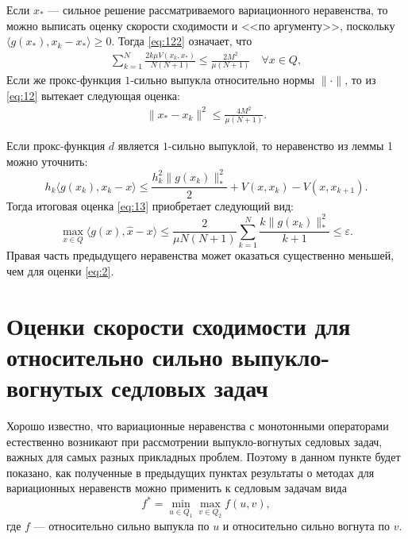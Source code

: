     \begin{remark}
        Если $x_*$ --- сильное решение рассматриваемого вариационного не\-равенства, то можно выписать оценку скорости сходимости и <<по аргументу>>, поскольку $\langle g(x_*), x_k - x_*\rangle \geq 0$. Тогда \eqref{eq:122} означает, что 
            \begin{equation} \label{eq:12}
            \begin{aligned} 
                \sum_{k=1}^{N} \frac{2k\mu V(x_k, x_*)}{N(N+1)} \leq \frac{2M^2}{\mu(N+1)} \quad  \forall x \in Q,
            \end{aligned}
            \end{equation}
        Если же прокс-функция $1$-сильно выпукла относительно нормы $\|\cdot\|$, то из \eqref{eq:12} вытекает следующая оценка:
            \begin{equation} 
            \begin{aligned} 
                \|x_* - x_k\|^2 \leq \frac{4M^2}{\mu(N+1)}.
            \end{aligned}
            \end{equation}
    \end{remark}
    \begin{remark} \label{remark4}
        Если прокс-функция $d$ является $1$-сильно выпуклой, то неравенство из леммы 1 можно уточнить:
        \begin{equation} \label{base_eq}
            h_k \langle g(x_k), x_k - x \rangle \leq \frac{h_k^2 \|g(x_k)\|_*^2}{2} + V(x, x_k) - V(x, x_{k+1}). 
        \end{equation}
        Тогда итоговая оценка \eqref{eq:13} приобретает следующий вид:
        \begin{equation}
            \max_{x \in Q} \langle g(x), \widehat{x} - x \rangle \leq \frac{2}{\mu N (N+1)} \sum_{k=1}^{N} \frac{k \|g(x_k)\|_*^2}{k+1} \leq \varepsilon.
        \end{equation}
        Правая часть предыдущего неравенства может оказаться существенно меньшей, чем для оценки \eqref{eq:2}.
    \end{remark}

\section{Оценки скорости сходимости для относительно сильно выпукло-вогнутых седловых задач} \label{sec:ch2/sec3}

    Хорошо известно, что вариационные неравенства с монотонными операторами естественно возникают при рассмотрении выпукло-вогнутых седловых задач, важных для самых разных прикладных проблем. Поэтому в данном пункте будет показано, как полученные в предыдущих пунктах результаты о методах для вариационных неравенств можно применить к седловым задачам вида
    \begin{equation}\label{eqsedlo}
        f^* = \min_{u \in Q_1} \max_{v \in Q_2} f(u, v),
    \end{equation}
    где $f$ --- относительно сильно выпукла по $u$ и относительно сильно вогнута по $v$.


